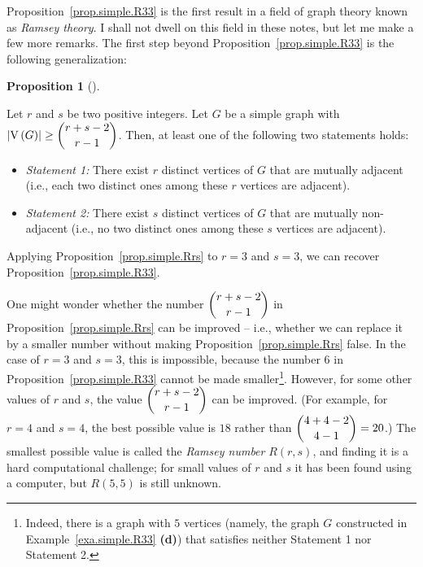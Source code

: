 \documentclass[numbers=enddot,12pt,final,onecolumn,notitlepage]{scrartcl}%
\theoremstyle{definition}
\newtheorem{prop}[theo]{Proposition}
\newenvironment{proposition}[1][]
{\begin{prop}[#1]\begin{leftbar}}
{\end{leftbar}\end{prop}}
\newcommand{\abs}[1]{\left| #1 \right|}
\newcommand{\tup}[1]{\left( #1 \right)}
\newcommand{\verts}[1]{\operatorname{V}\left( #1 \right)}
\begin{document}
Proposition~\ref{prop.simple.R33} is the first result in a field
of graph theory known as \textit{Ramsey theory}. I shall not dwell on
this field in these notes, but let me make a few more remarks.
The first step beyond Proposition~\ref{prop.simple.R33} is the
following generalization:

\begin{proposition} \label{prop.simple.Rrs}
Let $r$ and $s$ be two positive integers.
Let $G$ be a simple graph with
$\abs{\verts{G}} \geq \dbinom{r+s-2}{r-1}$.
Then, at least one of the following two statements holds:

\begin{itemize}
\item \textit{Statement 1:} There exist $r$ distinct vertices
of $G$ that are mutually adjacent (i.e., each two distinct ones among
these $r$ vertices are adjacent).

\item \textit{Statement 2:} There exist $s$ distinct vertices
of $G$ that are mutually non-adjacent (i.e., no two distinct ones
among these $s$ vertices are adjacent).
\end{itemize}
\end{proposition}

Applying Proposition~\ref{prop.simple.Rrs} to $r=3$ and $s=3$, we can
recover Proposition~\ref{prop.simple.R33}.

One might wonder whether the number $\dbinom{r+s-2}{r-1}$ in
Proposition~\ref{prop.simple.Rrs} can be improved -- i.e., whether we
can replace it by a smaller number without making
Proposition~\ref{prop.simple.Rrs} false. In the case of $r=3$ and
$s=3$, this is impossible, because the number $6$ in
Proposition~\ref{prop.simple.R33} cannot be made
smaller\footnote{Indeed, there is a graph with $5$ vertices (namely,
the graph $G$ constructed in
Example~\ref{exa.simple.R33} \textbf{(d)}) that
satisfies neither Statement 1 nor Statement 2.}. However, for some
other values of $r$ and $s$, the value $\dbinom{r+s-2}{r-1}$ can be
improved. (For example, for $r=4$ and $s=4$, the best possible value
is $18$ rather than $\dbinom{4+4-2}{4-1}=20$.) The smallest possible
value is called the \textit{Ramsey number} $R\tup{r,s}$, and
finding it is a hard computational challenge; for small values of $r$
and $s$ it has been found using a computer, but $R\tup{5,5}$ is still
unknown.
\end{document}
